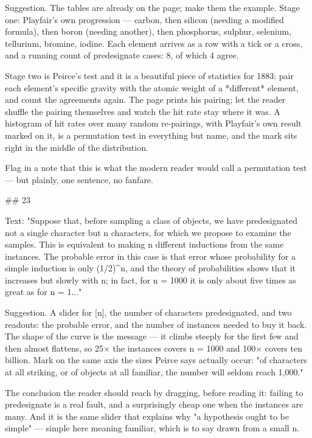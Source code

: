 Suggestion. The tables are already on the page; make them the example. Stage
one: Playfair's own progression — carbon, then silicon (needing a modified
formula), then boron (needing another), then phosphorus, sulphur, selenium,
tellurium, bromine, iodine. Each element arrives as a row with a tick or a
cross, and a running count of predesignate cases: 8, of which 4 agree.

Stage two is Peirce's test and it is a beautiful piece of statistics for 1883:
pair each element's specific gravity with the atomic weight of a *different*
element, and count the agreements again. The page prints his pairing; let the
reader shuffle the pairing themselves and watch the hit rate stay where it was.
A histogram of hit rates over many random re-pairings, with Playfair's own
result marked on it, is a permutation test in everything but name, and the mark
sits right in the middle of the distribution.

Flag in a note that this is what the modern reader would call a permutation
test — but plainly, one sentence, no fanfare.


## 23

Text: "Suppose that, before sampling a class of objects, we have predesignated
not a single character but n characters, for which we propose to examine the
samples. This is equivalent to making n different inductions from the same
instances. The probable error in this case is that error whose probability for a
simple induction is only (1/2)^n, and the theory of probabilities shows that it
increases but slowly with n; in fact, for n = 1000 it is only about five times
as great as for n = 1..."

Suggestion. A slider for [n], the number of characters predesignated, and two
readouts: the probable error, and the number of instances needed to buy it back.
The shape of the curve is the message — it climbs steeply for the first few and
then almost flattens, so 25× the instances covers n = 1000 and 100× covers ten
billion. Mark on the same axis the sizes Peirce says actually occur: "of
characters at all striking, or of objects at all familiar, the number will
seldom reach 1,000."

The conclusion the reader should reach by dragging, before reading it: failing
to predesignate is a real fault, and a surprisingly cheap one when the instances
are many. And it is the same slider that explains why "a hypothesis ought to be
simple" — simple here meaning familiar, which is to say drawn from a small n.


